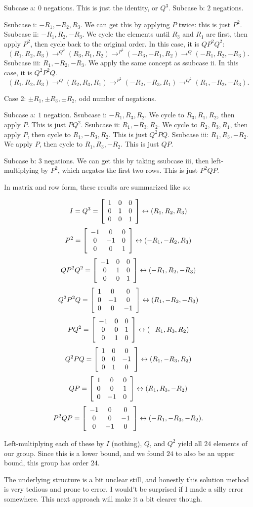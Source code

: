 \documentclass[../key.tex]{subfiles}
\begin{document}
Subcase a: $0$ negations. This is just the identity, or $Q^3$.
Subcase b: $2$ negations.

Ssubcase i: $-R_1, -R_2, R_3$.
We can get this by applying $P$ twice: this is just $P^2$.
Ssubcase ii: $-R_1, R_2, -R_3$.
We cycle the elements until $R_3$ and $R_1$ are first, then apply $P^2$, then cycle back to the original order. In this case, it is $QP^2Q^2$:
$$(R_1,R_2,R_3)\rightarrow^{Q^2} (R_3,R_1,R_2)\rightarrow^{P^2} (-R_3,-R_1,R_2)\rightarrow^{Q} (-R_1,R_2,-R_3).$$
Ssubcase iii: $R_1, -R_2, -R_3$.
We apply the same concept as ssubcase ii. In this case, it is $Q^2P^2Q$.
$$(R_1,R_2,R_3)\rightarrow^{Q} (R_2,R_3,R_1) \rightarrow^{P^2} (-R_2,-R_3,R_1) \rightarrow^{Q^2} (R_1, -R_2, -R_3).$$

Case 2: $\pm R_1, \pm R_3, \pm R_2$, odd number of negations.

Subcase a: $1$ negation.
Ssubcase i: $-R_1, R_3, R_2$.
We cycle to $R_3, R_1, R_2$, then apply $P$. This is just $PQ^2$.
Ssubcase ii: $R_1, -R_3, R_2$.
We cycle to $R_2, R_3, R_1$, then apply $P$, then cycle to $R_1, -R_3, R_2$. This is just $Q^2PQ$.
Ssubcase iii: $R_1, R_3, -R_2$.
We apply $P$, then cycle to $R_1, R_3, -R_2$. This is just $QP$.

Subcase b: $3$ negations.
We can get this by taking ssubcase iii, then left-multiplying by $P^2$, which negates the first two rows. This is just $P^2QP$.

In matrix and row form, these results are summarized like so:

$$I = Q^3 = \left[\begin{array}{ccc} 1 & 0 & 0 \\ 0 & 1 & 0 \\ 0 & 0 & 1 \end{array}\right] \leftrightarrow (R_1,R_2,R_3)$$
$$P^2 = \left[\begin{array}{ccc} -1 & 0 & 0 \\ 0 & -1 & 0 \\ 0 & 0 & 1 \end{array}\right] \leftrightarrow (-R_1,-R_2,R_3)$$
$$QP^2Q^2 = \left[\begin{array}{ccc} -1 & 0 & 0 \\ 0 & 1 & 0 \\ 0 & 0 & 1 \end{array}\right] \leftrightarrow (-R_1,R_2,-R_3)$$
$$Q^2P^2Q = \left[\begin{array}{ccc} 1 & 0 & 0 \\ 0 & -1 & 0 \\ 0 & 0 & -1 \end{array}\right] \leftrightarrow (R_1,-R_2,-R_3)$$
$$PQ^2 = \left[\begin{array}{ccc} -1 & 0 & 0 \\ 0 & 0 & 1 \\ 0 & 1 & 0 \end{array}\right] \leftrightarrow (-R_1,R_3,R_2)$$
$$Q^2PQ = \left[\begin{array}{ccc} 1 & 0 & 0 \\ 0 & 0 & -1 \\ 0 & 1 & 0 \end{array}\right] \leftrightarrow (R_1,-R_3,R_2)$$
$$QP = \left[\begin{array}{ccc} 1 & 0 & 0 \\ 0 & 0 & 1 \\ 0 & -1 & 0 \end{array}\right] \leftrightarrow (R_1,R_3,-R_2)$$
$$P^2QP = \left[\begin{array}{ccc} -1 & 0 & 0 \\ 0 & 0 & -1 \\ 0 & -1 & 0 \end{array}\right] \leftrightarrow (-R_1,-R_3,-R_2).$$

Left-multiplying each of these by $I$ (nothing), $Q$, and $Q^2$ yield all $24$ elements of our group. Since this is a lower bound, and we found $24$ to also be an upper bound, this group has order $24$.

The underlying structure is a bit unclear still, and honestly this solution method is very tedious and prone to error. I would't be surprised if I made a silly error somewhere. This next approach will make it a bit clearer though.
\end{document}
